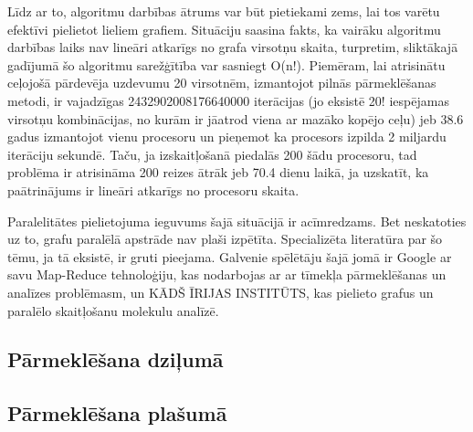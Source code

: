 Līdz ar to, algoritmu darbības ātrums var būt pietiekami zems, lai tos varētu
efektīvi pielietot lieliem grafiem. Situāciju saasina fakts, ka vairāku algoritmu
darbības laiks nav lineāri atkarīgs no grafa virsotņu
skaita, turpretim, sliktākajā gadījumā šo algoritmu sarežģītība var sasniegt O(n!). Piemēram,
lai atrisinātu ceļojošā pārdevēja uzdevumu 20 virsotnēm, izmantojot pilnās pārmeklēšanas metodi,
ir vajadzīgas 2432902008176640000 iterācijas (jo eksistē 20! iespējamas virsotņu kombinācijas,
no kurām ir jāatrod viena ar mazāko kopējo ceļu) jeb 38.6 gadus izmantojot vienu procesoru
un pieņemot ka procesors izpilda 2 miljardu iterāciju sekundē. Taču, ja izskaitļošanā piedalās
200 šādu procesoru, tad problēma ir atrisināma 200 reizes ātrāk jeb 70.4 dienu laikā, ja
uzskatīt, ka paātrinājums ir lineāri atkarīgs no procesoru skaita.

Paralelitātes pielietojuma ieguvums šajā situācijā ir acīmredzams. Bet neskatoties
uz to, grafu paralēlā apstrāde nav plaši izpētīta. Specializēta literatūra par šo
tēmu, ja tā eksistē, ir gruti pieejama. Galvenie spēlētāju šajā jomā
ir Google ar savu Map-Reduce tehnoloģiju, kas nodarbojas ar ar tīmekļa pārmeklēšanas
un analīzes problēmasm, un KĀDŠ ĪRIJAS INSTITŪTS, kas pielieto grafus un paralēlo
skaitļošanu molekulu analīzē.

\subsection{Pārmeklēšana dziļumā}
\subsection{Pārmeklēšana plašumā}

